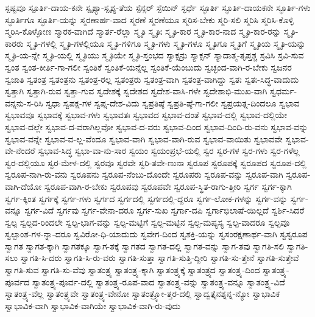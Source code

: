 {ಸ್ಪಷ್ಟವೂ
ಸ್ಪೂರ್ತಿ-ದಾಯ-ಕನೇ
ಸ್ಪೃಶ್ಯಾ-ಸ್ಪೃಶ್ಯ-ತೆಯ
ಸ್ಪೆನ್ಸರ್
ಸ್ಪೆಯಿನ್
ಸ್ಫರ್ಧೆ
ಸ್ಫೂರ್ತಿ
ಸ್ಫೂರ್ತಿ-ದಾಯಕನೇ
ಸ್ಫೂರ್ತಿ-ಗಳು
ಸ್ಫೂರ್ತಿಗೂ
ಸ್ಫೂರ್ತಿ-ಯನ್ನು
ಸ್ಮರಣಾರ್ಹ-ವಾದ
ಸ್ಮರಣೆ
ಸ್ಮರಣೆಯೂ
ಸ್ಮರಿಸ-ಬೇಕು
ಸ್ಮರಿ-ಸಲಿ
ಸ್ಮರಿಸಿ
ಸ್ಮರಿಸಿ-ಕೊಳ್ಳಿ
ಸ್ಮರಿಸಿ-ಕೊಳ್ಳೋಣ
ಸ್ಮಾರಕ-ವಾಗಿದೆ
ಸ್ಮಾರ್ತ-ರೆಲ್ಲಾ
ಸ್ಮೃತಿ
ಸ್ಮೃತಿಃ
ಸ್ಮೃತಿ-ಕಾರ
ಸ್ಮೃತಿ-ಕಾರ-ನಾದ
ಸ್ಮೃತಿ-ಕಾರ-ರನ್ನು
ಸ್ಮೃತಿ-ಕಾರರು
ಸ್ಮೃತಿ-ಗಳಲ್ಲಿ
ಸ್ಮೃತಿ-ಗಳಲ್ಲಿಯೂ
ಸ್ಮೃತಿ-ಗಳಿಗೂ
ಸ್ಮೃತಿ-ಗಳು
ಸ್ಮೃತಿ-ಗಳೂ
ಸ್ಮೃತಿಗೂ
ಸ್ಮೃತಿಗೆ
ಸ್ಮೃತಿಯ
ಸ್ಮೃತಿ-ಯನ್ನು
ಸ್ಮೃತಿ-ಯ-ನ್ನೇ
ಸ್ಮೃತಿ-ಯಲ್ಲಿ
ಸ್ಮೃತಿಯು
ಸ್ಮೃತಿಯೇ
ಸ್ಮೃತಿ-ಸ್ತಂಭದ
ಸ್ಯಾಕ್ಸನ್ರು
ಸ್ಯಾಕ್ಸನ್
ಸ್ಯಾದಾತ್ಮ-ತೃಪ್ತಶ್ಚ
ಸ್ರವಿಸಿ
ಸ್ರವಿ-ಸುವ
ಸ್ವಂತ
ಸ್ವಂತ-ಕೀರ್ತಿ-ಗಾ-ಗಲೀ
ಸ್ವಂತಿಕೆ
ಸ್ವಂತಿಕೆ-ಯನ್ನೆಲ್ಲ
ಸ್ವಂತಿಕೆ-ಯೆಂಬುದು
ಸ್ವಚ್ಛಂದ-ವಾಗಿ-ರ-ಬೇಕು
ಸ್ವಜನರ
ಸ್ವಜಾತಿ
ಸ್ವತಂತ್ರ
ಸ್ವತಂತ್ರನು
ಸ್ವತಂತ್ರ-ರಲ್ಲ
ಸ್ವತಂತ್ರರು
ಸ್ವತಂತ್ರ-ವಾಗಿ
ಸ್ವತಂತ್ರ-ವಾಗಿದ್ದು
ಸ್ವತಃ
ಸ್ವತಃ-ಸಿದ್ಧ-ವಾದುದು
ಸ್ವತ್ತಾಗಿ
ಸ್ವತ್ತಾಗಿ-ರುವ
ಸ್ವತ್ತಾ-ಗುವ
ಸ್ವದೇಶಕ್ಕೆ
ಸ್ವದೇಶದ
ಸ್ವದೇಶ-ವಾಸಿ-ಗಳೇ
ಸ್ವದೇಶಾಭಿ-ಮುಖ-ವಾಗಿ
ಸ್ವಧರ್ಮ-ವನ್ನನು-ಸ-ರಿಸಿ
ಸ್ವಧಾ
ಸ್ವಪಕ್ಷ-ಗಳ
ಸ್ವಪ್ನ-ದೇಶ-ವಿದು
ಸ್ವಪ್ರತಿಷ್ಠೆ
ಸ್ವಪ್ರತಿ-ಷ್ಠೆ-ಗಾ-ಗಲೀ
ಸ್ವಪ್ರಯತ್ನ-ದಿಂದಲೂ
ಸ್ವಭಾವ
ಸ್ವಭಾವವೂ
ಸ್ವಭಾವಕ್ಕೆ
ಸ್ವಭಾವ-ಗಳು
ಸ್ವಭಾವತಃ
ಸ್ವಭಾವದ
ಸ್ವಭಾವ-ದಂತೆ
ಸ್ವಭಾವ-ದಲ್ಲಿ
ಸ್ವಭಾವ-ದಲ್ಲಿಯೇ
ಸ್ವಭಾವ-ದಲ್ಲೇ
ಸ್ವಭಾವ-ದ-ವರಾಗಿಲ್ಲವೋ
ಸ್ವಭಾವ-ದ-ವರು
ಸ್ವಭಾವ-ದಿಂದ
ಸ್ವಭಾವ-ದಿಂದಿ-ರು-ವನು
ಸ್ವಭಾವ-ವನ್ನು
ಸ್ವಭಾವ-ವನ್ನೇ
ಸ್ವಭಾವ-ವ-ಲ್ಲ-ವೆಂದೂ
ಸ್ವಭಾವ-ವಾಗಿ
ಸ್ವಭಾವ-ವಾಗಿ-ರುವ
ಸ್ವಭಾವ-ವಾಯಿತು
ಸ್ವಭಾವವೇ
ಸ್ವಭಾವ-ವೇ-ನೆಂದರೆ
ಸ್ವಭಾವ-ಸಿದ್ಧ
ಸ್ವಭಾ-ವಾ-ನು-ಸಾರ
ಸ್ವಯಂ
ಸ್ವಯಂಪ್ರಭೆ-ಯಲ್ಲಿ
ಸ್ವರ
ಸ್ವರ-ಗಳ
ಸ್ವರ-ಗಳು
ಸ್ವರ-ಗಳೆಲ್ಲ
ಸ್ವರ-ದಲ್ಲಿಯೂ
ಸ್ವರ-ಮೇಳ-ದಲ್ಲಿ
ಸ್ವರವೂ
ಸ್ವರವೇ
ಸ್ವರಿ-ತವೇ-ಣುನಾ
ಸ್ವರೂಪ
ಸ್ವರೂಪಕ್ಕೆ
ಸ್ವರೂಪದ
ಸ್ವರೂಪ-ದಲ್ಲಿ
ಸ್ವರೂಪ-ನಾಗಿ-ರು-ವನು
ಸ್ವರೂಪನು
ಸ್ವರೂಪ-ನೆಂಬು-ದೊಂದೇ
ಸ್ವರೂಪರು
ಸ್ವರೂಪ-ವನ್ನು
ಸ್ವರೂಪ-ವಾಗಿ
ಸ್ವರೂಪ-ವಾಗಿ-ದೆಯೋ
ಸ್ವರೂಪ-ವಾಗಿ-ರ-ಬೇಕು
ಸ್ವರೂಪವು
ಸ್ವರೂಪವೇ
ಸ್ವರೂಪ-ಸ್ಥಿತ-ರಾಗು-ತ್ತೀರಿ
ಸ್ವರ್ಗ
ಸ್ವರ್ಗ-ಕ್ಕಾಗಿ
ಸ್ವರ್ಗ-ಕ್ಕಿಂತ
ಸ್ವರ್ಗಕ್ಕೆ
ಸ್ವರ್ಗ-ಗಳು
ಸ್ವರ್ಗದ
ಸ್ವರ್ಗದಲ್ಲಿ
ಸ್ವರ್ಗದಲ್ಲಿ-ದ್ದರೂ
ಸ್ವರ್ಗ-ಲೋಕ-ಗಳನ್ನು
ಸ್ವರ್ಗ-ವನ್ನು
ಸ್ವರ್ಗ-ವನ್ನೂ
ಸ್ವರ್ಗ-ವಿದೆ
ಸ್ವರ್ಗವು
ಸ್ವರ್ಗ-ವೇನಾ-ದರೂ
ಸ್ವರ್ಗ-ಸುಖ
ಸ್ವರ್ಗಾ-ದಪಿ
ಸ್ವರ್ಗಾಭಿಲಾಷೆ-ಯಿಲ್ಲದೆ
ಸ್ವರ್ಶಿ-ಸಿದರೆ
ಸ್ವಲ್ಪ
ಸ್ವಲ್ಪದ-ರಿಂದಲೇ
ಸ್ವಲ್ಪ-ಭಾಗ-ವನ್ನು
ಸ್ವಲ್ಪ-ಮಟ್ಟಿಗೆ
ಸ್ವಲ್ಪ-ಮಟ್ಟಿನ
ಸ್ವಲ್ಪ-ಮಪ್ಯಸ್ಯ
ಸ್ವಲ್ಪ-ವಾದರೂ
ಸ್ವಲ್ಪವೂ
ಸ್ವಲ್ಪಾಂಶ-ಗಳ-ನ್ನಾ-ದರೂ
ಸ್ವವಿರೋ-ಧಿ-ಯಾದುದು
ಸ್ವವೇಗ-ದಿಂದ
ಸ್ವಶಕ್ತಿ-ಯನ್ನು
ಸ್ವಸಂರಕ್ಷಣಾರ್ಥ-ವಾಗಿ
ಸ್ವಸ್ವರೂಪ
ಸ್ವಾಗತ
ಸ್ವಾಗತ-ಕ್ಕಾಗಿ
ಸ್ವಾಗತಕ್ಕೂ
ಸ್ವಾಗ-ತಕ್ಕೆ
ಸ್ವಾಗತದ
ಸ್ವಾಗತ-ದಲ್ಲಿ
ಸ್ವಾಗತ-ವನ್ನು
ಸ್ವಾಗ-ತವು
ಸ್ವಾಗತಿ-ಸಲಿ
ಸ್ವಾಗತಿ-ಸಲು
ಸ್ವಾಗತಿ-ಸಿ-ದರು
ಸ್ವಾಗತಿ-ಸಿ-ರು-ವರು
ಸ್ವಾಗತಿ-ಸುತ್ತಾ
ಸ್ವಾಗತಿ-ಸುತ್ತಿ-ದ್ದೀರಿ
ಸ್ವಾಗತಿ-ಸು-ತ್ತೇನೆ
ಸ್ವಾಗತಿ-ಸುತ್ತೇವೆ
ಸ್ವಾಗತಿ-ಸುವ
ಸ್ವಾಗತಿ-ಸು-ವೆವು
ಸ್ವಾತಂತ್ರ್ಯ
ಸ್ವಾತಂತ್ರ್ಯ-ಕ್ಕಾಗಿ
ಸ್ವಾತಂತ್ರ್ಯಕ್ಕೆ
ಸ್ವಾತಂತ್ರ್ಯದ
ಸ್ವಾತಂತ್ರ್ಯ-ದಿಂದ
ಸ್ವಾತಂತ್ರ್ಯ-ಪೂರ್ವದ
ಸ್ವಾತಂತ್ರ್ಯ-ಪೂರ್ವ-ದಲ್ಲಿ
ಸ್ವಾತಂತ್ರ್ಯ-ರೂಪ-ವಾದ
ಸ್ವಾತಂತ್ರ್ಯ-ವನ್ನು
ಸ್ವಾತಂತ್ರ್ಯ-ವನ್ನೂ
ಸ್ವಾತಂತ್ರ್ಯ-ವಿದೆ
ಸ್ವಾತಂತ್ರ್ಯ-ವೆಲ್ಲ
ಸ್ವಾತಂತ್ರ್ಯವೇ
ಸ್ವಾತಂತ್ರ್ಯ-ವೇನೋ
ಸ್ವಾತಂತ್ರ್ಯೋ-ತ್ತರ-ದಲ್ಲಿ
ಸ್ವಾದ್ವತ್ತೈನಶ್ನನ್ನ-ನ್ಯೋ
ಸ್ವಾಭಾವಿಕ
ಸ್ವಾಭಾವಿಕ-ವಾಗಿ
ಸ್ವಾಭಾವಿಕ-ವಾಗಿಯೇ
ಸ್ವಾಭಾವಿಕ-ವಾಗಿ-ರು-ವುದು
}
